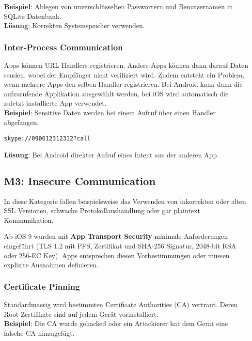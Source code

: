 \textbf{Beispiel}: Ablegen von unverschlüsselten Passwörtern und Benutzernamen in SQLite Datenbank.\\

\textbf{Lösung}: Korrekten Systemspeicher verwenden.

\subsubsection{Inter-Process Communication}
Apps können URL Handlers registrieren. Andere Apps können dann darauf Daten senden, wobei der Empfänger nicht verifiziert wird. Zudem entsteht ein Problem, wenn mehrere Apps den selben Handler registrieren. Bei Android kann dann die aufzurufende Applikation ausgewählt werden, bei iOS wird automatisch die zuletzt installierte App verwendet.\\

\textbf{Beispiel}: Sensitive Daten werden bei einem Aufruf über einen Handler abgefangen.
\begin{lstlisting}[language=XML, caption=Aufruf von Skype]
skype://090012312312?call
\end{lstlisting}

\textbf{Lösung}: Bei Android direkter Aufruf eines Intent aus der anderen App.

\subsection{M3: Insecure Communication}
In diese Kategorie fallen beispielsweise das Verwenden von inkorrekten oder alten SSL Versionen, schwache Protokollaushandlung oder gar plaintext Kommunikation.

Ab iOS 9 wurden mit \textbf{App Transport Security} minimale Anforderungen eingeführt (TLS 1.2 mit PFS, Zertifikat und SHA-256 Signatur, 2048-bit RSA oder 256-EC Key). Apps entsprechen diesen Vorbestimmungen oder müssen explizite Ausnahmen definieren.

\subsubsection{Certificate Pinning}
Standardmässig wird bestimmten Certificate Authorities (CA) vertraut. Deren Root Zertifikate sind auf jedem Gerät vorinstalliert.\\

\textbf{Beispiel}: Die CA wurde gehacked oder ein Attackierer hat dem Gerät eine falsche CA hinzugefügt. \\


